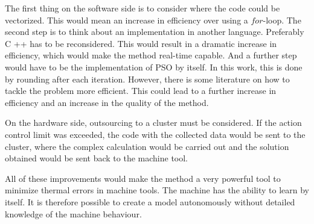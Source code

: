 The first thing on the software side is to consider where the code could be vectorized. This would mean an increase in efficiency over using a $for$-loop.  The second step is to think about an implementation in another language. Preferably C ++ has to be reconsidered. This would result in a dramatic increase in efficiency, which would make the method real-time capable. And a further step would have to be the implementation of PSO by itself. In this work, this is done by rounding after each iteration. However, there is some literature on how to tackle the problem more efficient. This could lead to a further increase in efficiency and an increase in the quality of the method.

On the hardware side, outsourcing to a cluster must be considered. If the action control limit was exceeded, the code with the collected data would be sent to the cluster, where the complex calculation would be carried out and the solution obtained would be sent back to the machine tool.

All of these improvements would make the method a very powerful tool to minimize thermal errors in machine tools. The machine has the ability to learn by itself. It is therefore possible to create a model autonomously without detailed knowledge of the machine behaviour.




